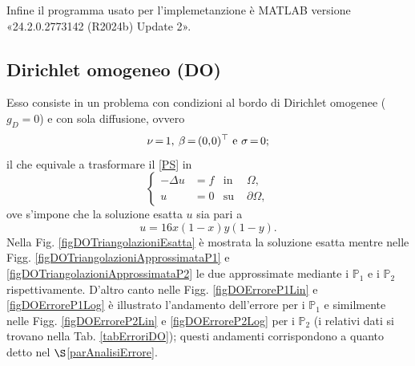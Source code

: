 \documentclass{article}
\newcommand{\SpaziaturaMate}[3]{
    \setlength{\thinmuskip}{#1mu}
    \setlength{\medmuskip}{#2mu}
    \setlength{\thickmuskip}{#3mu}
}
\newcommand{\teqref}[2]{\hyperref[#1]{#2}}
\begin{document}
            Infine il programma usato per l'implemetanzione è MATLAB versione «24.2.0.2773142 (R2024b) Update 2».

        
        \subsection{Dirichlet omogeneo (DO)}

            Esso consiste in un problema con condizioni al bordo di Dirichlet omogenee ($g_D=0$) e con sola diffusione, ovvero
            \begin{equation*}
                \setlength{\abovedisplayskip}{5pt plus 2pt minus 2pt}  %
                \setlength{\belowdisplayskip}{5pt plus 2pt minus 2pt}  %
                \SpaziaturaMate{1}{2}{3}
                \nu=1,\;\;\beta=(0,0)^{\top}\text{ e }\sigma=0;
            \end{equation*}
            il che equivale a trasformare il \teqref{eqProblemaStazionario}{[PS]} in
            \begin{equation}
                \left\{
                \begin{aligned}
                    -\Delta u&=f&\text{in }&\Omega, \\
                            u&=0&\text{su }&\partial\Omega,
                \end{aligned}
                \right.
                \label{eqDO}
            \end{equation}
            ove s'impone che la soluzione esatta $u$ sia pari a
            \begin{equation*}
                u=16x(1-x)y(1-y).
                \label{eqSoluzioneEsattaDO}
            \end{equation*}
            Nella Fig. \ref{figDOTriangolazioniEsatta} è mostrata la soluzione esatta mentre nelle Figg. \ref{figDOTriangolazioniApprossimataP1} e \ref{figDOTriangolazioniApprossimataP2} le due approssimate mediante i $\mathbb P_1$ e i $\mathbb P_2$ rispettivamente. D'altro canto nelle Figg. \ref{figDOErroreP1Lin} e \ref{figDOErroreP1Log} è illustrato l'andamento dell'errore per i $\mathbb P_1$ e similmente nelle Figg. \ref{figDOErroreP2Lin} e \ref{figDOErroreP2Log} per i $\mathbb P_2$ (i relativi dati si trovano nella Tab. \ref{tabErroriDO}); questi andamenti corrispondono a quanto detto nel $\S$\ref{parAnalisiErrore}.
\end{document}
